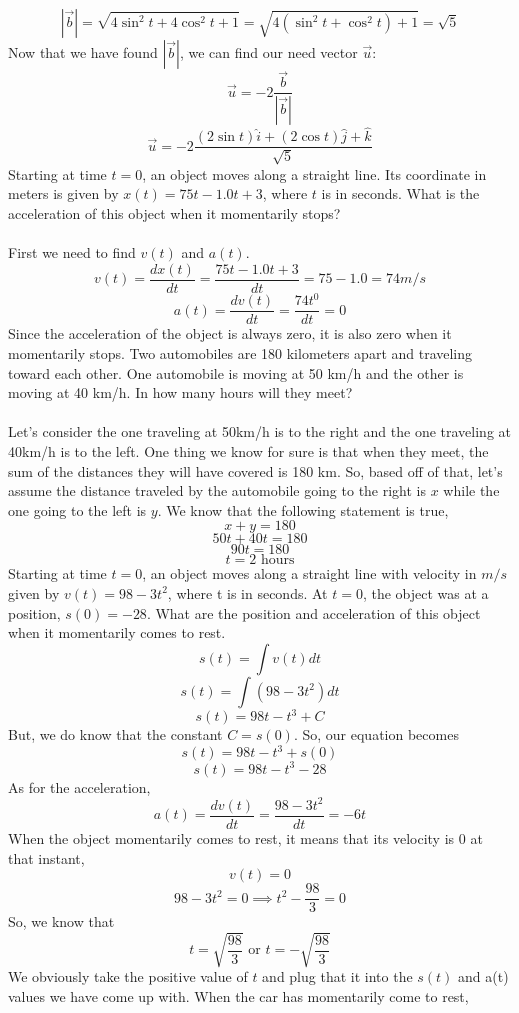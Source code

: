 \documentclass[12pt,addpoints]{exam}
\begin{document}
{{{\begin{questions}
					$$|\vec{b}|=\sqrt{4\sin^2 t+4\cos^2 t+1}=\sqrt{4(\sin^2 t+\cos^2 t)+1}=\sqrt{5}$$
					Now that we have found $|\vec{b}|$, we can find our need vector $\vec{u}$:
					$$\vec{u}=-2\dfrac{\vec{b}}{|\vec{b}|}$$
					$$\vec{u}=-2\dfrac{(2\sin t)\hat{i}+(2\cos t)\hat{j}+\hat{k}}{\sqrt{5}}$$
					\question[1] Starting at time $t = 0$, an object moves along a straight line. Its coordinate in meters is given by $x(t) = 75t-1.0t+3$, where $t$ is in seconds. What is the acceleration of this object when it momentarily stops?\\ \\
					First we need to find $v(t)$ and $a(t)$.
					$$v(t)=\dfrac{dx(t)}{dt}=\dfrac{75t-1.0t+3}{dt}=75-1.0=74m/s$$
					$$a(t)=\dfrac{dv(t)}{dt}=\dfrac{74t^0}{dt}=0$$
					Since the acceleration of the object is always zero, it is also zero when it momentarily stops.
					\question[1] Two automobiles are 180 kilometers apart and traveling toward each other. One automobile is moving at 50 km/h and the other is moving at 40 km/h. In how many hours will they meet? \\ \\
					Let's consider the one traveling at 50km/h is to the right and the one traveling at 40km/h is to the left. One thing we know for sure is that when they meet, the sum of the distances they will have covered is 180 km. So, based off of that, let's assume the distance traveled by the automobile going to the right is $x$ while the one going to the left is $y$. We know that the following statement is true,
					$$x+y=180$$
					$$50t+40t=180$$
					$$90t=180$$
					$$t=2 \text{ hours}$$
					\question[2] Starting at time $t = 0$, an object moves along a straight line with velocity in $m/s$ given by $v(t) = 98-3t^2$, where t is in seconds. At $t=0$, the object was at a position, $s(0)=-28$. What are the position and acceleration of this object when it momentarily comes to rest.
					$$s(t)=\int v(t)dt$$
					$$s(t)=\int (98-3t^2)dt$$
					$$s(t)=98t-t^3+C$$
					But, we do know that the constant $C=s(0)$. So, our equation becomes
					$$s(t)=98t-t^3+s(0)$$
					$$s(t)=98t-t^3-28$$
					As for the acceleration,
					$$a(t)=\dfrac{dv(t)}{dt}=\dfrac{98-3t^2}{dt}=-6t$$
					When the object momentarily comes to rest, it means that its velocity is 0 at that instant,
					$$v(t)=0$$
					$$98-3t^2=0\implies t^2-\dfrac{98}{3}=0$$
					So, we know that
					$$t=\sqrt{\dfrac{98}{3}}\text{ or }t=-\sqrt{\dfrac{98}{3}}$$
					We obviously take the positive value of $t$ and plug that it into the $s(t)$ and a(t) values we have come up with. When the car has momentarily come to rest,

\end{questions}}}}
\end{document}
